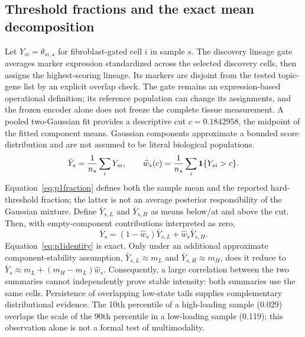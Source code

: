 \documentclass[10pt,a4paper]{article}
\begin{document}
\subsection{Threshold fractions and the exact mean decomposition}
Let $Y_{si}=\theta_{si,\star}$ for fibroblast-gated cell $i$ in sample $s$. The discovery lineage gate averages marker expression standardized across the selected discovery cells, then assigns the highest-scoring lineage. Its markers are disjoint from the tested topic-gene list by an explicit overlap check. The gate remains an expression-based operational definition; its reference population can change its assignments, and the frozen encoder alone does not freeze the complete tissue measurement. A pooled two-Gaussian fit provides a descriptive cut $c=0.1842958$, the midpoint of the fitted component means. Gaussian components approximate a bounded score distribution and are not assumed to be literal biological populations.
\begin{equation}
\bar Y_s=\frac1{n_s}\sum_iY_{si},\qquad
\widehat w_s(c)=\frac1{n_s}\sum_i\mathbf{1}\{Y_{si}>c\}.\label{eq:p1fraction}
\end{equation}
Equation~\eqref{eq:p1fraction} defines both the sample mean and the reported hard-threshold fraction; the latter is not an average posterior responsibility of the Gaussian mixture. Define $\bar Y_{s,L}$ and $\bar Y_{s,H}$ as means below/at and above the cut. Then, with empty-component contributions interpreted as zero,
\begin{equation}
\bar Y_s=(1-\widehat w_s)\bar Y_{s,L}+\widehat w_s\bar Y_{s,H}.\label{eq:p1identity}
\end{equation}
Equation~\eqref{eq:p1identity} is exact. Only under an additional approximate component-stability assumption, $\bar Y_{s,L}\approx m_L$ and $\bar Y_{s,H}\approx m_H$, does it reduce to $\bar Y_s\approx m_L+(m_H-m_L)\widehat w_s$. Consequently, a large correlation between the two summaries cannot independently prove stable intensity: both summaries use the same cells. Persistence of overlapping low-state tails supplies complementary distributional evidence. The 10th percentile of a high-loading sample (0.029) overlaps the scale of the 90th percentile in a low-loading sample (0.119); this observation alone is not a formal test of multimodality.
\end{document}
